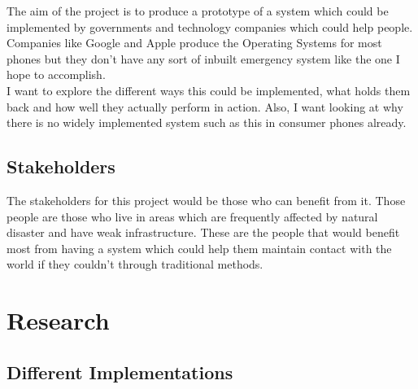 \documentclass{report}
\begin{document}
The aim of the project is to produce a prototype of a system which could be implemented by governments and technology 
companies which could help people. Companies like Google and Apple produce the Operating Systems for most phones but 
they don't have any sort of inbuilt emergency system like the one I hope to accomplish. 
\bigskip\\
I want to explore the different ways this could be implemented, what holds them back and how well they actually perform 
in action. Also, I want looking at why there is no widely implemented system such as this in consumer phones already. 

\section*{Stakeholders}

The stakeholders for this project would be those who can benefit from it. Those people are those who live in areas 
which are frequently affected by natural disaster and have weak infrastructure. These are the people that would benefit 
most from having a system which could help them maintain contact with the world if they couldn't through traditional 
methods.

\chapter*{Research}

\section*{Different Implementations}
\end{document}
